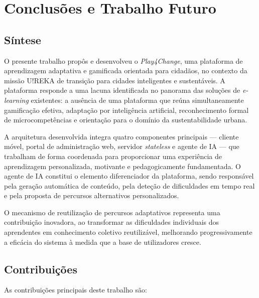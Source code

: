 %
%
\chapter{Conclusões e Trabalho Futuro}
\label{cha:conclusoes}

\section{Síntese}
\label{sec:sintese}

O presente trabalho propôs e desenvolveu o \textit{Play4Change}, uma plataforma de aprendizagem adaptativa e gamificada orientada para cidadãos, no contexto da missão U!REKA de transição para cidades inteligentes e sustentáveis. A plataforma responde a uma lacuna identificada no panorama das soluções de \textit{e-learning} existentes: a ausência de uma plataforma que reúna simultaneamente gamificação efetiva, adaptação por inteligência artificial, reconhecimento formal de microcompetências e orientação para o domínio da sustentabilidade urbana.

A arquitetura desenvolvida integra quatro componentes principais — cliente móvel, portal de administração web, servidor \textit{stateless} e agente de IA --- que trabalham de forma coordenada para proporcionar uma experiência de aprendizagem personalizada, motivante e pedagogicamente fundamentada. O agente de IA constitui o elemento diferenciador da plataforma, sendo responsável pela geração automática de conteúdo, pela deteção de dificuldades em tempo real e pela proposta de percursos alternativos personalizados.

O mecanismo de reutilização de percursos adaptativos representa uma contribuição inovadora, ao transformar as dificuldades individuais dos aprendentes em conhecimento coletivo reutilizável, melhorando progressivamente a eficácia do sistema à medida que a base de utilizadores cresce.

\section{Contribuições}
\label{sec:contribuicoes_conclusao}

As contribuições principais deste trabalho são:

